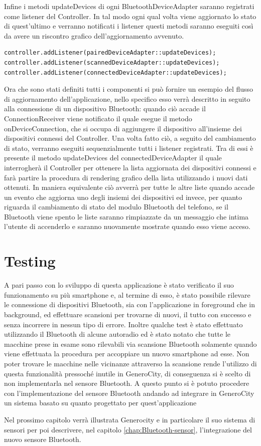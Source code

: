 Infine i metodi updateDevices di ogni BluetoothDeviceAdapter saranno registrati come listener del Controller. In tal modo ogni qual volta viene aggiornato lo stato di quest'ultimo e verranno notificati i listener questi metodi saranno eseguiti così da avere un riscontro grafico dell'aggiornamento avvenuto.
\begin{verbatim}
controller.addListener(pairedDeviceAdapter::updateDevices);
controller.addListener(scannedDeviceAdapter::updateDevices);
controller.addListener(connectedDeviceAdapter::updateDevices);
\end{verbatim}

Ora che sono stati definiti tutti i componenti si può fornire un esempio del flusso di aggiornamento dell'applicazione, nello specifico esso verrà descritto in seguito alla connessione di un dispositivo Bluetooth: quando ciò accade il ConnectionReceiver viene notificato il quale esegue il metodo onDeviceConnection, che si occupa di aggiungere il dispositivo all'insieme dei dispositivi connessi del Controller. Una volta fatto ciò, a seguito del cambiamento di stato, verranno eseguiti sequenzialmente tutti i listener registrati. Tra di essi è presente il metodo updateDevices del connectedDeviceAdapter il quale interrogherà il Controller per ottenere la lista aggiornata dei dispositivi connessi e farà partire la procedura di rendering grafico della lista utilizzando i nuovi dati ottenuti. In maniera equivalente ciò avverrà per tutte le altre liste quando accade un evento che aggiorna uno degli insiemi dei dispositivi ed invece, per quanto riguarda il cambiamento di stato del modulo Bluetooth del telefono, se il Bluetooth viene spento le liste saranno rimpiazzate da un messaggio che intima l'utente di accenderlo e saranno nuovamente mostrate quando esso viene acceso. 

\section{Testing}
A pari passo con lo sviluppo di questa applicazione è stato verificato il suo funzionamento su più smartphone e, al termine di esso, è stato possibile rilevare le connessione di dispositivi Bluetooth, sia con l'applicazione in foreground che in background, ed effettuare scansioni per trovarne di nuovi, il tutto con successo e senza incorrere in nessun tipo di errore. Inoltre qualche test è stato effettuato utilizzando il Bluetooth di alcune autoradio ed è stato notato che tutte le macchine prese in esame sono rilevabili via scansione Bluetooth solamente quando viene effettuata la procedura per accoppiare un nuovo smartphone ad esse. Non poter trovare le macchine nelle vicinanze attraverso la scansione rende l'utilizzo di questa funzionalità pressoché inutile in GeneroCity, di conseguenza si è scelto di non implementarla nel sensore Bluetooth.
A questo punto si è potuto procedere con l'implementazione del sensore Bluetooth andando ad integrare in GeneroCity un sistema basato su quanto progettato per quest'applicazione

Nel prossimo capitolo verrà illustrata Generocity e in particolare il suo sistema di sensori per poi descrivere, nel capitolo \ref{chap:Bluetooth-sensor}, l'integrazione del nuovo sensore Bluetooth.